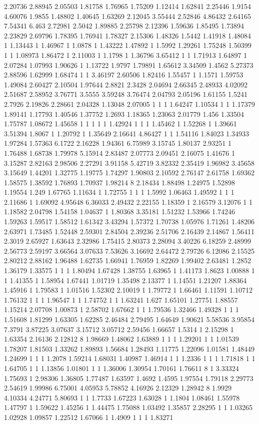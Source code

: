 2.20736 2.88945 2.05503 1.81758 1.76965 1.75209 1.12414 1.62841 2.25446 1.9154 4.60076 1.9855 1.48802 1.40645 1.63269 2.12045 3.55444 2.52846 4.86432 2.64165 7.54341 6.463 2.72981 2.5042 1.89885 2.25798 2.12396 1.59636 1.85495 1.73894 2.23829 2.69796 1.78395 1.76941 1.78327 2.15306 1.48326 1.5442 1.41918 1.48084 1 1.13443 1 1.46967 1 1.0878 1 1.43222 1.47892 1 1.5992 1.29261 1.75248 1.50399 1 1 1.08973 1.86472 1 2.11003 1 1.1798 1 1.36796 3.65412 1 1 1.71913 1.64897 1 2.07284 1.07993 1.90626 1 1.13722 1.9797 1.79891 1.65612 3.34509 1.4562 5.27373 2.88596 1.62999 1.68474 1 1 3.46197 2.60506 1.82416 1.55457 1 1.1571 1.59753 1.49084 2.60427 2.10504 1.97644 2.8821 2.3428 2.04694 2.66345 2.48933 4.02092 2.51687 2.58952 3.76771 3.5555 3.59248 3.76474 2.04793 2.05196 1.61155 1.5241 2.7926 2.19826 2.28661 2.04328 1.13048 2.07005 1 1 1 1.64247 1.10534 1 1 1.17379 1.89141 1.17793 1.40546 1.37752 1.2693 1.18365 1.23063 2.01779 1.456 1.33504 1.75787 1.08672 1.45658 1 1 1 1 1 1.42924 1 1 1 1.45462 1 1.52268 1 1.39661 3.51394 1.8067 1 1.20792 1 1.35649 2.16641 4.86427 1 1 1.54116 1.84023 1.34933 1.97284 1.57363 6.1722 2.16228 1.94361 6.75989 3.15745 1.80137 2.93251 1 1.76488 1.68738 1.79978 5.15914 2.83487 2.07773 2.09451 2.16075 1.41676 1 3.15287 2.82163 2.98506 2.27291 3.91158 5.42719 3.82332 2.35419 1.96982 3.45658 3.15649 1.44201 1.32775 1.19775 1.74297 1.90803 2.10592 2.76147 2.61758 1.69362 1.58575 1.38592 1.76893 1.70937 1.98214 8 2.18434 1.88498 1.24975 1.52898 1.19554 1.249 1.67765 1.11634 1 1.72755 1 1 1 1.5992 1.06463 1.49592 1 1 1 2.11686 1 1.69092 4.95648 6.36033 2.49432 2.22155 1.18359 1 2.16579 3.12076 1 1 1.18582 2.04798 1.54158 1.04637 1 1.80368 3.35181 1.51232 1.53966 1.74246 1.59263 1.59517 1.58512 1.61342 3.43294 1.57372 1.70738 1.05976 1.71261 1.48206 2.63971 1.73485 1.52448 2.59301 2.84504 2.39236 2.51706 2.16439 2.14867 1.56411 2.3019 2.65927 1.63643 2.32986 1.75415 2.80373 2.28094 3.40226 6.18259 2.48999 2.56773 2.59197 3.66564 3.07633 7.53626 3.16692 2.64472 2.79726 6.12086 2.15525 2.80212 2.88162 1.96488 1.62735 1.66941 1.76959 1.82269 1.99402 2.63481 1.2852 1.36179 1.33575 1 1 1 1.80494 1.67428 1.38755 1.63965 1 1.41173 1.8623 1.00888 1 1 1.41355 1 1.58954 1.67441 1.01719 1.35498 2.13377 1 1.14551 1.21207 1.88364 1.45916 1 1.79583 1 1.01516 1.52302 2.10019 1 1.79772 1 1.66461 1.11591 1.10712 1.76132 1 1 1 1.96547 1 1 1.74752 1 1 1.63241 1.627 1.65101 1.27751 1.88557 1.15214 2.07708 1.00873 1 2.58702 1.67662 1 1 1.79536 1.32466 1.49328 1 1 1 1.51608 1.81299 1.63305 1.62285 2.46484 2.79495 1.64649 1.90621 5.58536 3.95854 7.3791 3.87225 3.07637 3.15712 3.05712 2.59456 1.66657 1.5314 1 2.15298 1 1.63354 2.16136 2.12812 8 1.98669 1.48062 1.63889 1 1 1 1.29201 1 1 1.01539 1.78207 1.81503 1.33262 1.89893 1.56684 1.28493 1.11775 1.22096 1.01581 1.48449 1.24699 1 1 1 1.2078 1.59214 1.68031 1.40987 1.46914 1 1 1.2336 1 1 1 1.71818 1 1 1.64705 1 1 1.13856 1.01801 1 1 1.36006 1.30954 1.70161 1.76611 8 1 3.33324 1.75693 1 2.98306 1.36805 1.77487 1.63597 1.4692 1.4595 1.97554 1.79118 2.29773 2.54619 1.99986 6.75001 4.05953 5.78852 4.16926 2.12329 1.28942 8 1.9929 4.10334 4.24771 5.80693 1 1 1.7733 1.67223 1.63028 1 1.1804 1.08461 1.55978 1.47797 1 1.59622 1.45256 1 1.44475 1.75088 1.03492 1.35857 2.28295 1 1 1.03265 1.02928 1.09857 1.22512 1.67066 1 1.4909 1 1 1 1.83271 